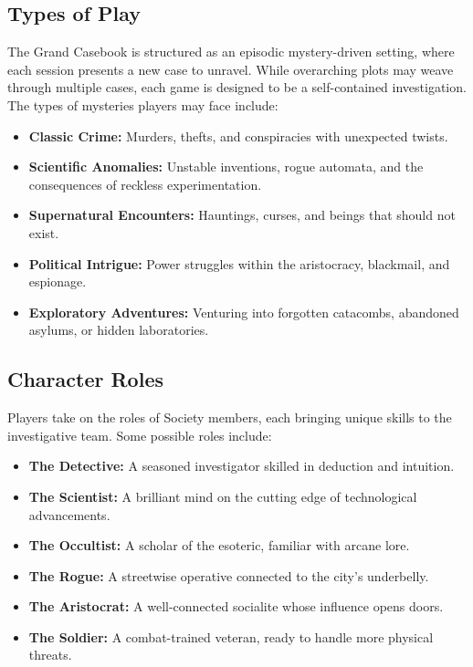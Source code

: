\subsection{Types of Play}

The Grand Casebook is structured as an episodic mystery-driven setting, where each session presents a new case to unravel. While overarching plots may weave through multiple cases, each game is designed to be a self-contained investigation. The types of mysteries players may face include:

\begin{itemize}
    \item \textbf{Classic Crime:} Murders, thefts, and conspiracies with unexpected twists.
    \item \textbf{Scientific Anomalies:} Unstable inventions, rogue automata, and the consequences of reckless experimentation.
    \item \textbf{Supernatural Encounters:} Hauntings, curses, and beings that should not exist.
    \item \textbf{Political Intrigue:} Power struggles within the aristocracy, blackmail, and espionage.
    \item \textbf{Exploratory Adventures:} Venturing into forgotten catacombs, abandoned asylums, or hidden laboratories.
\end{itemize}

\subsection{Character Roles}

Players take on the roles of Society members, each bringing unique skills to the investigative team. Some possible roles include:

\begin{itemize}
    \item \textbf{The Detective:} A seasoned investigator skilled in deduction and intuition.
    \item \textbf{The Scientist:} A brilliant mind on the cutting edge of technological advancements.
    \item \textbf{The Occultist:} A scholar of the esoteric, familiar with arcane lore.
    \item \textbf{The Rogue:} A streetwise operative connected to the city’s underbelly.
    \item \textbf{The Aristocrat:} A well-connected socialite whose influence opens doors.
    \item \textbf{The Soldier:} A combat-trained veteran, ready to handle more physical threats.
\end{itemize}


